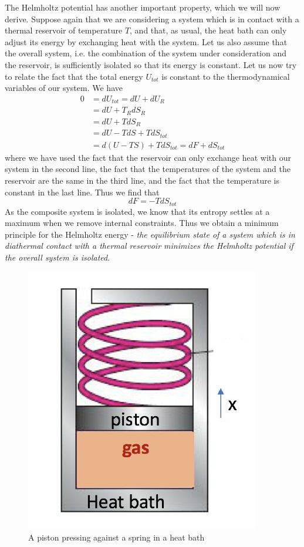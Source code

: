 \documentclass[a4paper, draft]{article}
\theoremstyle{own}
\theoremstyle{remark}
\begin{document}
The Helmholtz potential has another important property, which we will now derive. Suppose again that we are considering a system which is in contact with a thermal reservoir of temperature $T$, and that, as usual, the heat bath can only adjust its energy by exchanging heat with the system. Let us also assume that the overall system, i.e. the combination of the system under consideration and the reservoir, is sufficiently isolated so that its energy is constant. Let us now try to relate the fact that the total energy $U_{tot}$ is constant to the thermodynamical variables of our system. We have
\begin{align*}
0 &= dU_{tot} = dU + dU_R \\
&= dU + T_R dS_R \\
&= dU + T dS_R \\
&= dU - TdS +  T dS_{tot} \\
&= d(U - TS) + T dS_{tot} = dF + dS_{tot}
\end{align*}
where we have used the fact that the reservoir can only exchange heat with our system in the second line, the fact that the temperatures of the system and the reservoir are the same in the third line, and the fact that the temperature is constant in the last line. Thus we find that
$$
dF = - T dS_{tot} 
$$
As the composite system is isolated, we know that its entropy settles at a maximum when we remove internal constraints. Thus we obtain a minimum principle for the Helmholtz energy -  {\em the equilibrium state of a system which is in diathermal contact with a thermal reservoir minimizes the Helmholtz potential if the overall system is isolated}. 


\begin{figure}[ht]
	\begin{center}
	\includegraphics[scale=.5]{SpringLoadedPiston}
	\caption{A piston pressing against a spring in a heat bath}
	\label{fig:SpringLoadedPiston}
	\end{center}
\end{figure}
\end{document}
